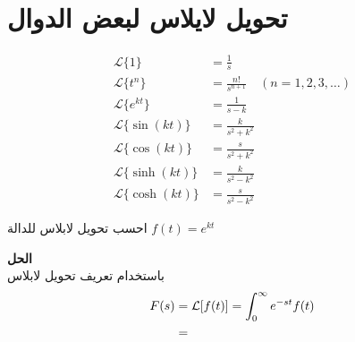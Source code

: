 \section{تحويل لايلاس لبعض الدوال}
\begin{align}
	\mathcal{L}\{1\}         &= \frac{1}{s}      \\
	\mathcal{L}\{t^n\}       &= \frac{n!}{s^{n+1}}   \quad (n = 1, 2, 3, \dots) \\
	\mathcal{L}\{e^{kt}\}    &= \frac{1}{s-k}        \\
	\mathcal{L}\{\sin(kt)\}  &= \frac{k}{s^2+k^2} \\
	\mathcal{L}\{\cos(kt)\} &= \frac{s}{s^2+k^2}   \\
	\mathcal{L}\{\sinh(kt)\} &= \frac{k}{s^2-k^2}   \\
	\mathcal{L}\{\cosh(kt)\} &= \frac{s}{s^2-k^2}    \
\end{align}

\begin{example}
	احسب تحويل لابلاس للدالة $f(t) = e^{kt}$
\end{example}
\noindent
\textbf{الحل}\\
\noindent
باستخدام تعريف تحويل لابلاس
\begin{align*}
	F(s) &= \mathcal{L}[f(t)] = \int_{0}^{\infty} e^{-st} f(t)\\
	&= 
\end{align*}